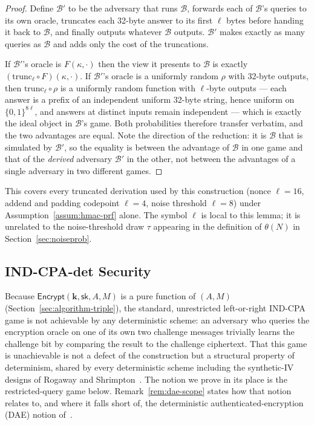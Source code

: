 \documentclass[11pt,a4paper]{article}
\begin{document}
\begin{proof}
Define $\mathcal{B}'$ to be the adversary that runs $\mathcal{B}$, forwards
each of $\mathcal{B}$'s queries to its own oracle, truncates each 32-byte
answer to its first $\ell$ bytes before handing it back to $\mathcal{B}$,
and finally outputs whatever $\mathcal{B}$ outputs. $\mathcal{B}'$ makes
exactly as many queries as $\mathcal{B}$ and adds only the cost of the
truncations.

If $\mathcal{B}'$'s oracle is $F(\kappa,\cdot)$ then the view it presents to
$\mathcal{B}$ is exactly $(\mathrm{trunc}_\ell\circ F)(\kappa,\cdot)$. If
$\mathcal{B}'$'s oracle is a uniformly random $\rho$ with 32-byte outputs,
then $\mathrm{trunc}_\ell\circ\rho$ is a uniformly random function with
$\ell$-byte outputs — each answer is a prefix of an independent uniform
32-byte string, hence uniform on $\{0,1\}^{8\ell}$, and answers at distinct
inputs remain independent — which is exactly the ideal object in
$\mathcal{B}$'s game. Both probabilities therefore transfer verbatim, and
the two advantages are equal. Note the direction of the reduction: it is
$\mathcal{B}$ that is simulated by $\mathcal{B}'$, so the equality is
between the advantage of $\mathcal{B}$ in one game and that of the
\emph{derived} adversary $\mathcal{B}'$ in the other, not between the
advantages of a single adversary in two different games.
\end{proof}

This covers every truncated derivation used by this construction (nonce
$\ell=16$, addend and padding codepoint $\ell=4$, noise threshold
$\ell=8$) under Assumption~\ref{assum:hmac-prf} alone. The symbol $\ell$ is
local to this lemma; it is unrelated to the noise-threshold draw $\tau$
appearing in the definition of $\theta(N)$ in Section~\ref{sec:noiseprob}.

\subsection{IND-CPA-det Security}
\label{sec:ind-cpa}

Because $\mathsf{Encrypt}(\mathbf{k},\mathsf{sk},A,M)$ is a pure function
of $(A,M)$ (Section~\ref{sec:algorithm-triple}), the standard,
unrestricted left-or-right IND-CPA game is not achievable by any
deterministic scheme: an adversary who queries the encryption oracle on
one of its own two challenge messages trivially learns the challenge bit
by comparing the result to the challenge ciphertext. That this game is
unachievable is not a defect of the construction but a structural property
of determinism, shared by every deterministic scheme including the
synthetic-IV designs of Rogaway and Shrimpton~\cite{rogaway2006}. The
notion we prove in its place is the restricted-query game below.
Remark~\ref{rem:dae-scope} states how that notion relates to, and where it
falls short of, the deterministic authenticated-encryption (DAE) notion
of~\cite{rogaway2006}.
\end{document}
